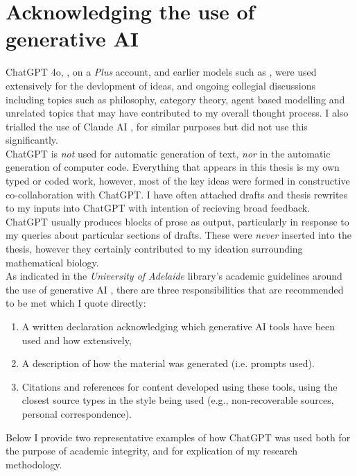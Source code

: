 \chapter{Acknowledging the use of generative AI}

ChatGPT 4o, \cite{openai2024chatgpt4o}, on a \textit{Plus} account, and earlier models such 
as \cite{openai2022chatgpt},  were used extensively for the devlopment of ideas, 
and ongoing collegial discussions including topics such as philosophy, 
category theory, agent based modelling and unrelated topics that may have contributed
to my overall thought process. I also trialled 
the use of Claude AI \cite{anthropic2024claude}, for similar purposes but did not 
use this significantly. 
\\

ChatGPT is \textit{not} used for automatic generation of text, \textit{nor} in the automatic 
generation of computer code. Everything that appears
in this thesis is my own typed or coded work, however,
most of the key ideas were formed in constructive co-collaboration with ChatGPT.
I have often attached drafts and thesis rewrites to my inputs 
into ChatGPT with intention of recieving broad feedback. ChatGPT usually produces
blocks of prose as output, particularly in response to
my queries about particular sections of drafts. 
These were \textit{never} inserted into the thesis, however 
they certainly contributed to my ideation surrounding mathematical biology.
\\

As indicated in the \textit{University of Adelaide} library's academic guidelines 
around the use of generative AI \cite{university2025academic}, there are three 
responsibilities that are recommended to be met which I quote directly:
\begin{enumerate}
    \item A written declaration acknowledging which generative AI tools have been used and how extensively,
    \item A description of how the material was generated (i.e. prompts used).
    \item Citations and references for content developed using these tools, 
    using the closest source types in the style being used (e.g., non-recoverable sources, personal correspondence).
\end{enumerate}

Below I provide two representative examples of how ChatGPT was used 
both for the purpose of academic integrity, and for explication of 
my research methodology.

